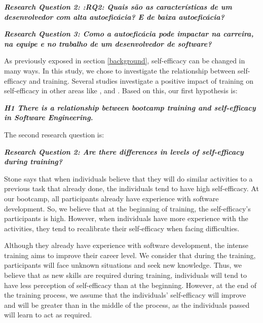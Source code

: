 \documentclass{TheMartianReport}
\begin{document}
 \textbf{\textit{Research Question 2: :RQ2: Quais são as características de um desenvolvedor com alta autoeficácia? E de baixa autoeficácia?}}
 \newline

 \textbf{\textit{Research Question 3: Como a autoeficácia pode impactar na carreira, na equipe e no trabalho de um desenvolvedor de software?}}
 \newline
 
 
As previously exposed in section \ref{background}, self-efficacy can be changed in many ways. In this study, we chose to investigate the relationship between self-efficacy and training. Several studies investigate a positive impact of training on self-efficacy in other areas like \cite{gist1989effects}, \cite{gist1989influence} and \cite{tannenbaum1991meeting}. Based on this, our first hypothesis is:
 \newline
   
\textbf{\textit{H1 There is a relationship between bootcamp training and self-efficacy in Software Engineering.}}
 \newline
   
The second research question is:
 \newline
 
\textbf{\textit{Research Question 2:  Are there differences in levels of self-efficacy during training?}}   
 \newline
 
 Stone \cite{stone1994overconfidence} says that when individuals believe that they will do similar activities to a previous task that already done, the individuals tend to have high self-efficacy. At our bootcamp, all participants already have experience with software development. So, we believe that at the beginning of training, the self-efficacy's participants is high. However, when individuals have more experience with the activities, they tend to recalibrate their self-efficacy when facing difficulties.

Although they already have experience with software development, the intense training aims to improve their career level. We consider that during the training, participants will face unknown situations and seek new knowledge. Thus, we believe that as new skills are required during training, individuals will tend to have less perception of self-efficacy than at the beginning. However, at the end of the training process, we assume that the individuals' self-efficacy will improve and will be greater than in the middle of the process, as the individuals passed will learn to act as required.
\end{document}
